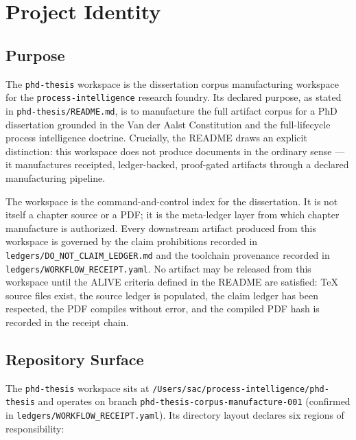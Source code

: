 
\section{Project Identity}
\label{sec:phd-thesis-identity}

\subsection{Purpose}
\label{sec:phd-thesis-identity-purpose}

The \texttt{phd-thesis} workspace is the dissertation corpus manufacturing workspace for the
\texttt{process-intelligence} research foundry. Its declared purpose, as stated in
\texttt{phd-thesis/README.md}, is to manufacture the full artifact corpus for a PhD
dissertation grounded in the Van der Aalst Constitution and the full-lifecycle process
intelligence doctrine. Crucially, the README draws an explicit distinction: this workspace does
not produce documents in the ordinary sense --- it manufactures receipted, ledger-backed,
proof-gated artifacts through a declared manufacturing pipeline.

The workspace is the command-and-control index for the dissertation. It is not itself a chapter
source or a PDF; it is the meta-ledger layer from which chapter manufacture is authorized.
Every downstream artifact produced from this workspace is governed by the claim prohibitions
recorded in \texttt{ledgers/DO\_NOT\_CLAIM\_LEDGER.md} and the toolchain provenance recorded
in \texttt{ledgers/WORKFLOW\_RECEIPT.yaml}. No artifact may be released from this workspace
until the ALIVE criteria defined in the README are satisfied: TeX source files exist, the source
ledger is populated, the claim ledger has been respected, the PDF compiles without error, and the
compiled PDF hash is recorded in the receipt chain.

\subsection{Repository Surface}
\label{sec:phd-thesis-identity-surface}

The \texttt{phd-thesis} workspace sits at
\texttt{/Users/sac/process-intelligence/phd-thesis} and operates on branch
\texttt{phd-thesis-corpus-manufacture-001}
(confirmed in \texttt{ledgers/WORKFLOW\_RECEIPT.yaml}). Its directory layout declares six
regions of responsibility:

